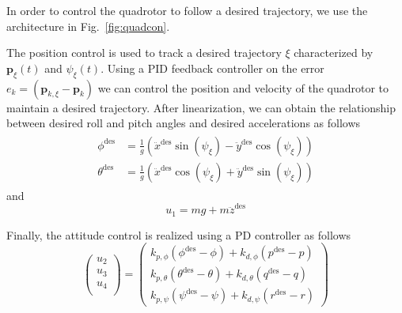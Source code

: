 \documentclass[letterpaper, 10 pt, conference]{ieeeconf}  %
\begin{document}
In order to control the quadrotor to follow a desired trajectory, we use the architecture in Fig.~\ref{fig:quadcon}.


The position control is used to track a desired trajectory $\xi$ characterized by ${\bm {p}}_\xi(t)$ and $\psi_\xi(t)$. Using a PID feedback controller on the error $e_k=(\bm {p}_{k,\xi}-\bm {p}_k)$ we can control the position and velocity of the quadrotor to maintain a desired trajectory.
After linearization, we can obtain the relationship between desired roll and pitch angles and desired accelerations as follows
\begin{gather}
\begin{align}
\phi^{\textrm{des}} &= \frac{1}{g}\left(\ddot{x}^{\textrm{des}}\sin(\psi_\xi) - \ddot{y}^{\textrm{des}}\cos(\psi_\xi)\right)\\
\theta^{\textrm{des}} &= \frac{1}{g}\left(\ddot{x}^{\textrm{des}}\cos(\psi_\xi) + \ddot{y}^{\textrm{des}}\sin(\psi_\xi)\right)
\end{align}
\end{gather}
and 
\begin{equation}
u_1 = mg + m\ddot{z}^{\textrm{des}} 
\end{equation}
 
Finally, the attitude control is realized using a PD controller as follows
\begin{equation}\label{eq:att}
\left(%
\begin{array}{c}
  u_2 \\
  u_3\\
  u_4\\
\end{array}%
\right) =\left(%
\begin{array}{c}
k_{p,\phi}(\phi^{\textrm{des}} - \phi) + k_{d,\phi}(p^{\textrm{des}} - p)\\
k_{p,\theta}(\theta^{\textrm{des}} - \theta) + k_{d,\theta}(q^{\textrm{des}} - q)\\
k_{p,\psi}(\psi^{\textrm{des}} - \psi) + k_{d,\psi}(r^{\textrm{des}} - r)
\end{array}%
\right)
\end{equation}
\end{document}
